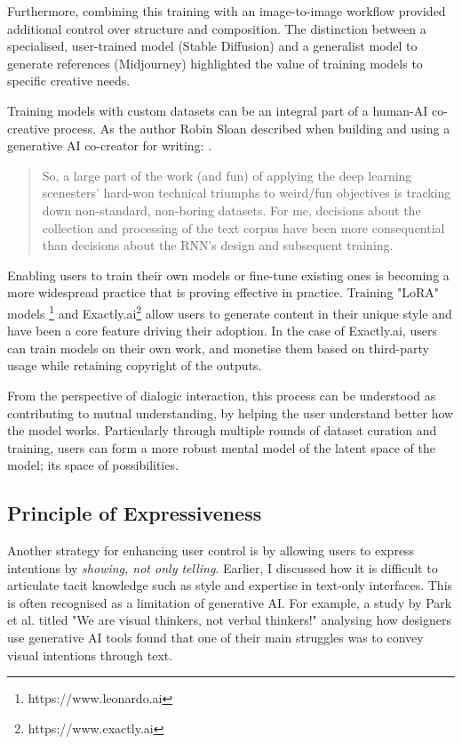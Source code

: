 Furthermore, combining this training with an image-to-image workflow provided additional control over structure and composition. The distinction between a specialised, user-trained model (Stable Diffusion) and a generalist model to generate references (Midjourney) highlighted the value of training models to specific creative needs.

Training models with custom datasets can be an integral part of a human-AI co-creative process. As the author Robin Sloan described when building and using a generative AI co-creator for writing: \cite{Sloan2016-fj}. 

\begin{quote}
So, a large part of the work (and fun) of applying the deep learning scenesters' hard-won technical triumphs to weird/fun objectives is tracking down non-standard, non-boring datasets. For me, decisions about the collection and processing of the text corpus have been more consequential than decisions about the RNN's design and subsequent training.
\end{quote}

Enabling users to train their own models or fine-tune existing ones is becoming a more widespread practice that is proving effective in practice. Training "LoRA" models \footnote{https://www.leonardo.ai} and Exactly.ai\footnote{https://www.exactly.ai} allow users to generate content in their unique style and have been a core feature driving their adoption. In the case of Exactly.ai, users can train models on their own work, and monetise them based on third-party usage while retaining copyright of the outputs.

From the perspective of dialogic interaction, this process can be understood as contributing to mutual understanding, by helping the user understand better how the model works. Particularly through multiple rounds of dataset curation and training, users can form a more robust mental model of the latent space of the model; its space of possibilities.

\subsection{Principle of Expressiveness}

Another strategy for enhancing user control is by allowing users to express intentions by \textit{showing, not only telling}. Earlier, I discussed how it is difficult to articulate tacit knowledge such as style and expertise in text-only interfaces. This is often recognised as a limitation of generative AI. For example, a study by Park et al. \cite{Park2024-gw} titled "We are visual thinkers, not verbal thinkers!" analysing how designers use generative AI tools found that one of their main struggles was to convey visual intentions through text.

